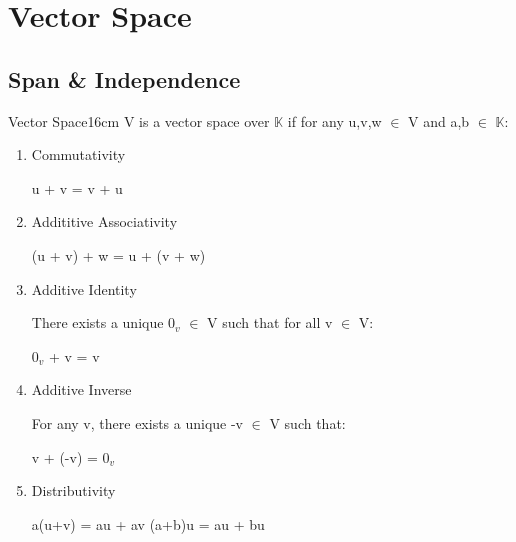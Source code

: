\newpage

\section[Day 2: Vector Space]{ Vector Space }

\subsection{ Span \& Independence }

    \begin{definition}{Vector Space}{16cm}
        V is a {\color{lblue} vector space} over $\mathbb{K}$ if for any
        u,v,w $\in$ V and a,b $\in$ $\mathbb{K}$:

        \begin{enumerate}[label=(\alph*), leftmargin=1cm, itemsep=0.1cm]
            \item {\color{lgreen} Commutativity}
            
                \hspace{0.5cm}
                u + v = v + u
    
            \item {\color{lgreen} Addititive Associativity}
            
                \hspace{0.5cm}
                (u + v) + w = u + (v + w)
    
            \item {\color{lgreen} Additive Identity}
            
                There exists a unique $0_v$ $\in$ V
                such that for all v $\in$ V:
    
                \hspace{0.5cm}
                $0_v$ + v = v

            \item {\color{lgreen} Additive Inverse}
            
                For any v, there exists a unique -v $\in$ V such that:
    
                \hspace{0.5cm}
                v + (-v) = $0_v$
    
            \item {\color{lgreen} Distributivity}
            
                \hspace{0.5cm}
                a(u+v) = au + av
                \hspace{1cm}
                (a+b)u = au + bu
    

\end{enumerate}
\end{definition}
